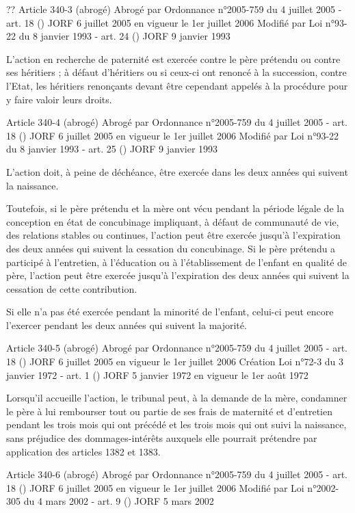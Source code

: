 \documentclass[
  12pt,
]{book}
\begin{document}
\begin{encadre}{??}
Article 340-3 (abrogé)
Abrogé par Ordonnance n°2005-759 du 4 juillet 2005 - art. 18 () JORF 6 juillet 2005 en vigueur le 1er juillet 2006
Modifié par Loi n°93-22 du 8 janvier 1993 - art. 24 () JORF 9 janvier 1993

L'action en recherche de paternité est exercée contre le père prétendu ou contre ses héritiers ; à défaut d'héritiers ou si ceux-ci ont renoncé à la succession, contre l'Etat, les héritiers renonçants devant être cependant appelés à la procédure pour y faire valoir leurs droits.

Article 340-4 (abrogé)
Abrogé par Ordonnance n°2005-759 du 4 juillet 2005 - art. 18 () JORF 6 juillet 2005 en vigueur le 1er juillet 2006
Modifié par Loi n°93-22 du 8 janvier 1993 - art. 25 () JORF 9 janvier 1993

L'action doit, à peine de déchéance, être exercée dans les deux années qui suivent la naissance.

Toutefois, si le père prétendu et la mère ont vécu pendant la période légale de la conception en état de concubinage impliquant, à défaut de communauté de vie, des relations stables ou continues, l'action peut être exercée jusqu'à l'expiration des deux années qui suivent la cessation du concubinage. Si le père prétendu a participé à l'entretien, à l'éducation ou à l'établissement de l'enfant en qualité de père, l'action peut être exercée jusqu'à l'expiration des deux années qui suivent la cessation de cette contribution.

Si elle n'a pas été exercée pendant la minorité de l'enfant, celui-ci peut encore l'exercer pendant les deux années qui suivent la majorité.

Article 340-5 (abrogé)
Abrogé par Ordonnance n°2005-759 du 4 juillet 2005 - art. 18 () JORF 6 juillet 2005 en vigueur le 1er juillet 2006
Création Loi n°72-3 du 3 janvier 1972 - art. 1 () JORF 5 janvier 1972 en vigueur le 1er août 1972

Lorsqu'il accueille l'action, le tribunal peut, à la demande de la mère, condamner le père à lui rembourser tout ou partie de ses frais de maternité et d'entretien pendant les trois mois qui ont précédé et les trois mois qui ont suivi la naissance, sans préjudice des dommages-intérêts auxquels elle pourrait prétendre par application des articles 1382 et 1383.

Article 340-6 (abrogé)
Abrogé par Ordonnance n°2005-759 du 4 juillet 2005 - art. 18 () JORF 6 juillet 2005 en vigueur le 1er juillet 2006
Modifié par Loi n°2002-305 du 4 mars 2002 - art. 9 () JORF 5 mars 2002


\end{encadre}
\end{document}
